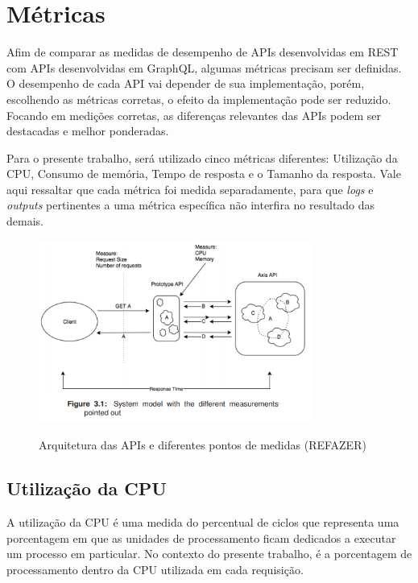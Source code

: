 \section{Métricas}\label{sec:metrics}

Afim de comparar as medidas de desempenho de APIs desenvolvidas em REST com APIs desenvolvidas em GraphQL, algumas métricas precisam ser definidas. O desempenho de cada API vai depender de sua implementação, porém, escolhendo as métricas corretas, o efeito da implementação pode ser reduzido. Focando em medições corretas, as diferenças relevantes das APIs podem ser destacadas e melhor ponderadas.

Para o presente trabalho, será utilizado cinco métricas diferentes: Utilização da CPU, Consumo de memória, Tempo de resposta e o Tamanho da resposta. Vale aqui ressaltar que cada métrica foi medida separadamente, para que \textit{logs} e \textit{outputs} pertinentes a uma métrica específica não interfira no resultado das demais.

\begin{figure}[htbp]
\centering
\includegraphics[width=0.8\textwidth]{figuras/metricas.PNG}
\label{fig:my-metrics}
\caption{Arquitetura das APIs e diferentes pontos de medidas (REFAZER)}
\author{fonte: Autor}
\end{figure}
\pagebreak


\subsection*{Utilização da CPU}

A utilização da CPU é uma medida do percentual de ciclos que representa uma porcentagem em que as unidades de processamento ficam dedicados a executar um processo em particular. No contexto do presente trabalho, é a porcentagem de processamento dentro da CPU utilizada em cada requisição.

